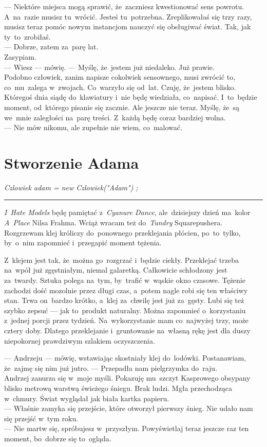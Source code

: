 \documentclass[9pt, a5paper]{memoir}
\begin{document}
--- Niektóre miejsca mogą sprawić, że~zaczniesz kwestionować sens powrotu. A~na~razie musisz tu~wrócić. Jesteś tu~potrzebna. Zreplikowałaś się trzy razy, musisz teraz pomóc nowym instancjom nauczyć się obsługiwać świat. Tak, jak ty~to~zrobiłaś.\\
--- Dobrze, zatem za~parę lat.\\
Zasypiam.\\
--- Wiesz --- mówię. --- Myślę, że~jestem już niedaleko. Już prawie.\\
Podobno człowiek, zanim napisze cokolwiek sensownego, musi zwrócić to, co~mu~zalega w~zwojach. Co~warzyło się od~lat. Czuję, że~jestem blisko. Któregoś dnia siądę do~klawiatury i~nie będę wiedziała, co~napisać. I~to~będzie moment, od~którego pisanie się zacznie. Ale jeszcze nie teraz. Myślę, że~są we~mnie zaległości na~parę treści. Z~każdą będę coraz bardziej wolna.\\
--- Nie mów nikomu, ale zupełnie nie wiem, co~malować.

\newpage
\section{Stworzenie Adama}
{
\itshape
Czlowiek adam = new Czlowiek("Adam") {};
}

\fancybreak{* \quad * \quad *}

\textit{I~Hate Models} będę pamiętać z~\textit{Cyanure Dance}, ale~dzisiejszy dzień ma~kolor \textit{A~Place} Nilsa Frahma. Wciąż wracam też do~\textit{Tundry} Squarepushera. Rozgrzewam klej króliczy do~ponownego przeklejania płócien, po~to~tylko, by~o~nim zapomnieć i~przegapić moment tężenia.

Z~klejem jest tak, że~można go~rozgrzać i~będzie ciekły. Przeklejać trzeba na~wpół już zgęstniałym, niemal galaretką. Całkowicie schłodzony jest za~twardy. Sztuka polega na~tym, by~trafić w~wąskie okno czasowe. Tężenie zachodzi dość mozolnie przez długi czas, a~potem nagle robi się ten właściwy stan. Trwa on~bardzo krótko, a~klej za~chwilę jest już za~gęsty. Lubi się też szybko zepsuć --- jak to~produkt naturalny. Można zapomnieć o~korzystaniu z~jednej porcji przez tydzień. Na~wykorzystanie mam co~najwyżej trzy, może cztery doby. Dlatego przeklejanie i~gruntowanie na~własną rękę jest dla duszy niepokornej prawdziwym szlakiem oczyszczenia.

--- Andrzeju --- mówię, wstawiając skostniały klej do~lodówki. Postanawiam, że~zajmę się nim już jutro. --- Przepadła nam pielgrzymka do~raju.\\
Andrzej zanurza się w~moje myśli. Pokazuję mu~szczyt Kasprowego obsypany blisko metrową warstwą świeżego śniegu. Brak ludzi. Mgła przechodząca w~chmury. Świat wyglądał jak biała kartka papieru.\\
--- Właśnie zamyka się przejście, które otworzył pierwszy śnieg. Nie udało nam się przejść w~tym roku.\\
--- Nie martw się, spróbujesz w~przyszłym. Powyświetlaj teraz jeszcze raz ten moment, bo~dobrze się to~ogląda.
\end{document}
